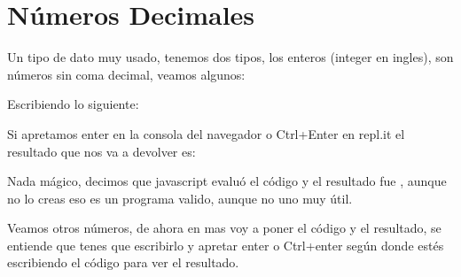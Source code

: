 \documentclass[letterpaper,10pt,spanish]{sphinxmanual}
\begin{document}
\section{Números Decimales}
\label{\detokenize{datos-con-javascript:numeros-decimales}}
Un tipo de dato muy usado, tenemos dos tipos, los enteros (integer en ingles),
son números sin coma decimal, veamos algunos:

Escribiendo lo siguiente:

%
\begin{sphinxVerbatim}[commandchars=\\\{\}]
\end{sphinxVerbatim}

Si apretamos enter en la consola del navegador o Ctrl+Enter en repl.it el
resultado que nos va a devolver es:

%
\begin{sphinxVerbatim}[commandchars=\\\{\}]
 
\end{sphinxVerbatim}

Nada mágico, decimos que javascript evaluó el código  y el resultado fue
, aunque no lo creas eso es un programa valido, aunque no uno muy útil.

Veamos otros números, de ahora en mas voy a poner el código y el resultado, se
entiende que tenes que escribirlo y apretar enter o Ctrl+enter según donde
estés escribiendo el código para ver el resultado.

%
\begin{sphinxVerbatim}[commandchars=\\\{\}]
\end{sphinxVerbatim}

%
\begin{sphinxVerbatim}[commandchars=\\\{\}]
 
\end{sphinxVerbatim}

%
\begin{sphinxVerbatim}[commandchars=\\\{\}]
\end{sphinxVerbatim}

%
\begin{sphinxVerbatim}[commandchars=\\\{\}]
 
\end{sphinxVerbatim}
\end{document}
